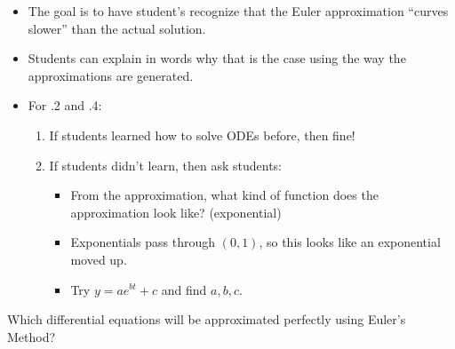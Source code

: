 \begin{annotation}
	\begin{goals}
		\begin{itemize}
			\item The goal is to have student's recognize that the Euler approximation ``curves slower'' than the actual solution.
			\item Students can explain in words why that is the case using the way the approximations are generated.\\

			\item For .2 and .4: 
			\begin{enumerate}[label=(\alph*)]
				\item If students learned how to solve ODEs before, then fine!
				\item If students didn't learn, then ask students:
				\begin{itemize}
					\item From the approximation, what kind of function does the approximation look like?  (exponential)
					\item Exponentials pass through $(0,1)$, so this looks like an exponential moved up.
					\item Try $y=a e^{bt}+c$ and find $a,b,c$.
				\end{itemize}
			\end{enumerate}
		\end{itemize}
	\end{goals}
\end{annotation}




\bookonlynewpage



\question
	Which differential equations will be approximated perfectly using Euler's Method?

